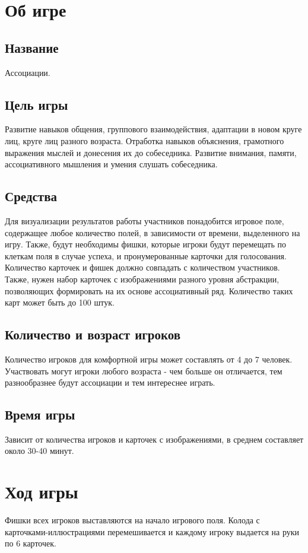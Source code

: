 \setcounter{page}{3}

\chapter{Об игре}

\section{Название}
Ассоциации.

\section{Цель игры}
Развитие навыков общения, группового взаимодействия, адаптации в новом круге лиц, круге лиц разного возраста. Отработка навыков объяснения, грамотного выражения мыслей и донесения их до собеседника. Развитие внимания, памяти, ассоциативного мышления и умения слушать собеседника.

\section{Средства}
Для визуализации результатов работы участников понадобится игровое поле, содержащее любое количество полей, в зависимости от времени, выделенного на игру. Также, будут необходимы фишки, которые игроки будут перемещать по клеткам поля в случае успеха, и пронумерованные карточки для голосования. Количество карточек и фишек должно совпадать с количеством участников. Также, нужен набор карточек с изображениями разного уровня абстракции, позволяющих формировать на их основе ассоциативный ряд. Количество таких карт может быть до 100 штук.

\section{Количество и возраст игроков}
Количество игроков для комфортной игры может составлять от 4 до 7 человек. Участвовать могут игроки любого возраста - чем больше он отличается, тем разнообразнее будут ассоциации и тем интереснее играть.

\section{Время игры}
Зависит от количества игроков и карточек с изображениями, в среднем составляет около 30-40 минут.

\chapter{Ход игры}
Фишки всех игроков выставляются на начало игрового поля. Колода с карточками-иллюстрациями перемешивается и каждому игроку выдается на руки по 6 карточек. 

